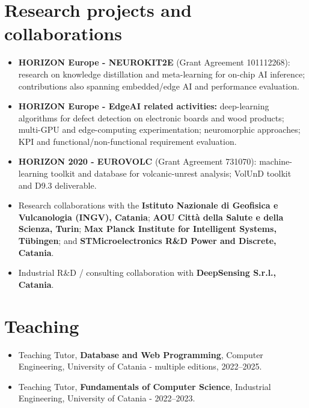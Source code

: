 \documentclass[10pt,a4paper]{article}
\begin{document}
\section{Research projects and collaborations}
\begin{itemize}
\item \textbf{HORIZON Europe - NEUROKIT2E} (Grant Agreement 101112268): research on knowledge distillation and meta-learning for on-chip AI inference; contributions also spanning embedded/edge AI and performance evaluation.
\item \textbf{HORIZON Europe - EdgeAI related activities:} deep-learning algorithms for defect detection on electronic boards and wood products; multi-GPU and edge-computing experimentation; neuromorphic approaches; KPI and functional/non-functional requirement evaluation.
\item \textbf{HORIZON 2020 - EUROVOLC} (Grant Agreement 731070): machine-learning toolkit and database for volcanic-unrest analysis; VolUnD toolkit and D9.3 deliverable.
\item Research collaborations with the \textbf{Istituto Nazionale di Geofisica e Vulcanologia (INGV), Catania}; \textbf{AOU Città della Salute e della Scienza, Turin}; \textbf{Max Planck Institute for Intelligent Systems, Tübingen}; and \textbf{STMicroelectronics R\&D Power and Discrete, Catania}.
\item Industrial R\&D / consulting collaboration with \textbf{DeepSensing S.r.l., Catania}.
\end{itemize}

\section{Teaching}
\begin{itemize}
\item Teaching Tutor, \textbf{Database and Web Programming}, Computer Engineering, University of Catania - multiple editions, 2022--2025.
\item Teaching Tutor, \textbf{Fundamentals of Computer Science}, Industrial Engineering, University of Catania - 2022--2023.
\end{itemize}
\end{document}
